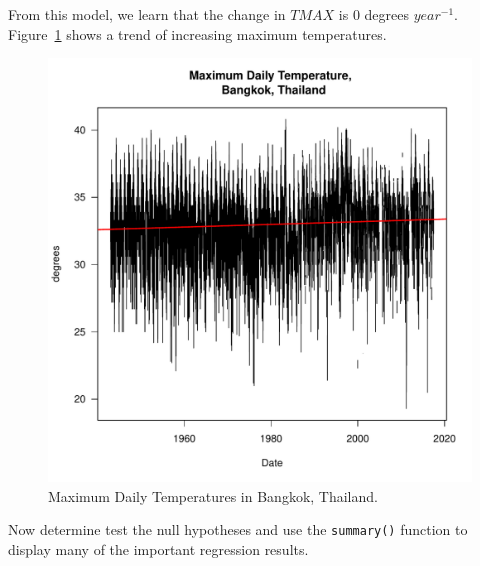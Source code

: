 \documentclass{article}\usepackage[]{graphicx}\usepackage[]{color}
\makeatletter
\def\maxwidth{ %
  \ifdim\Gin@nat@width>\linewidth
    \linewidth
  \else
    \Gin@nat@width
  \fi
}
\newenvironment{knitrout}{}{} %
\makeatother
\begin{document}
From this model, we learn that the change in $TMAX$ is 
0 degrees $year^{-1}$. Figure~\ref{fig:TMAX_trend} shows a trend of increasing maximum temperatures.

\begin{figure}
\label{fig:TMAX_trend}
\caption{Maximum Daily Temperatures in Bangkok, Thailand.}
\begin{knitrout}
\color{fgcolor}
\includegraphics[width=\maxwidth]{figure/unnamed-chunk-3-1} 

\end{knitrout}
\end{figure}

Now determine test the null hypotheses and use the \texttt{summary()} function to display many of the important regression results.
\end{document}
